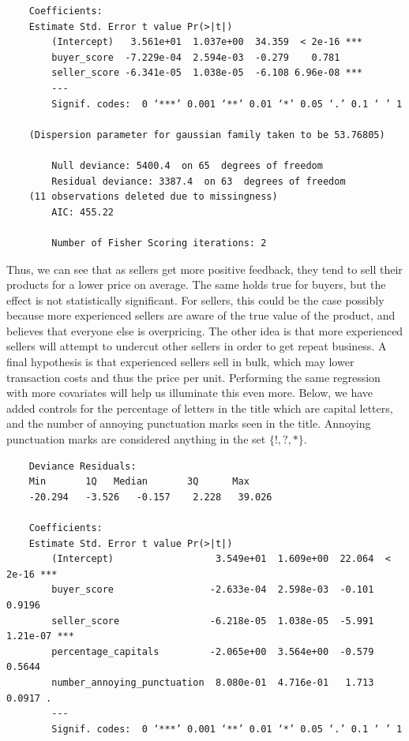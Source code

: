 \documentclass[psamsfonts]{amsart}
\newenvironment{sol}{\vspace{0.25cm}{\large \bfseries Solution:}}{\qedsymbol}
\begin{document}
\begin{sol}
\begin{verbatim}
    Coefficients:
    Estimate Std. Error t value Pr(>|t|)    
        (Intercept)   3.561e+01  1.037e+00  34.359  < 2e-16 ***
        buyer_score  -7.229e-04  2.594e-03  -0.279    0.781    
        seller_score -6.341e-05  1.038e-05  -6.108 6.96e-08 ***
        ---
        Signif. codes:  0 ‘***’ 0.001 ‘**’ 0.01 ‘*’ 0.05 ‘.’ 0.1 ‘ ’ 1 
    
    (Dispersion parameter for gaussian family taken to be 53.76805)
    
        Null deviance: 5400.4  on 65  degrees of freedom
        Residual deviance: 3387.4  on 63  degrees of freedom
    (11 observations deleted due to missingness)
        AIC: 455.22
    
        Number of Fisher Scoring iterations: 2
\end{verbatim}

Thus, we can see that as sellers get more positive feedback, they tend to sell their products for a lower price on average. The same holds true for buyers, but the effect is not statistically significant. For sellers, this could be the case possibly because more experienced sellers are aware of the true value of the product, and believes that everyone else is overpricing. The other idea is that more experienced sellers will attempt to undercut other sellers in order to get repeat business. A final hypothesis is that experienced sellers sell in bulk, which may lower transaction costs and thus the price per unit. Performing the same regression with more covariates will help us illuminate this even more. Below, we have added controls for the percentage of letters in the title which are capital letters, and the number of annoying punctuation marks seen in the title. Annoying punctuation marks are considered anything in the set $\{!,?,*\}$.

\begin{verbatim}
    Deviance Residuals: 
    Min       1Q   Median       3Q      Max  
    -20.294   -3.526   -0.157    2.228   39.026  
    
    Coefficients:
    Estimate Std. Error t value Pr(>|t|)    
        (Intercept)                  3.549e+01  1.609e+00  22.064  < 2e-16 ***
        buyer_score                 -2.633e-04  2.598e-03  -0.101   0.9196    
        seller_score                -6.218e-05  1.038e-05  -5.991 1.21e-07 ***
        percentage_capitals         -2.065e+00  3.564e+00  -0.579   0.5644    
        number_annoying_punctuation  8.080e-01  4.716e-01   1.713   0.0917 .  
        ---
        Signif. codes:  0 ‘***’ 0.001 ‘**’ 0.01 ‘*’ 0.05 ‘.’ 0.1 ‘ ’ 1 
    

\end{verbatim}
\end{sol}
\end{document}

